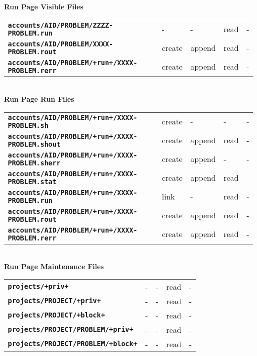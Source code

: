 \documentclass[12pt]{article}
\newcommand{\TT}[1]{{\tt \bfseries #1}}
\begin{document}
\begin{center}
{\bf Run Page Visible Files}
\\[1ex]
\begin{tabular}{lllll}
\TT{accounts/AID/PROBLEM/ZZZZ-PROBLEM.run}  & -  & - & read & - \\
\TT{accounts/AID/PROBLEM/XXXX-PROBLEM.rout} & create  & append  & read & - \\
\TT{accounts/AID/PROBLEM/+run+/XXXX-PROBLEM.rerr}
					    & create  & append  & read & - \\
\end{tabular}
\\\bigskip
{\bf Run Page Run Files}
\\[1ex]
\begin{tabular}{lllll}
\TT{accounts/AID/PROBLEM/+run+/XXXX-PROBLEM.sh}     & create  & - & - & - \\
\TT{accounts/AID/PROBLEM/+run+/XXXX-PROBLEM.shout}  & create  & append & read
                                                                       & - \\
\TT{accounts/AID/PROBLEM/+run+/XXXX-PROBLEM.sherr}  & create  & append & -
                                                                       & - \\
\TT{accounts/AID/PROBLEM/+run+/XXXX-PROBLEM.stat}   & create  & append & read
                                                                       & - \\
\TT{accounts/AID/PROBLEM/+run+/XXXX-PROBLEM.run}    & link    & - & read & - \\
\TT{accounts/AID/PROBLEM/+run+/XXXX-PROBLEM.rout}   & create  & append & read
                                                                       & - \\
\TT{accounts/AID/PROBLEM/+run+/XXXX-PROBLEM.rerr}   & create  & append & read
                                                                       & - \\
\end{tabular}
\\\bigskip
{\bf Run Page Maintenance Files}
\\[1ex]
\begin{tabular}{lllll}
\TT{projects/+priv+}			& -  & - & read & - \\
\TT{projects/PROJECT/+priv+}		& -  & - & read & - \\
\TT{projects/PROJECT/+block+}		& -  & - & read & - \\
\TT{projects/PROJECT/PROBLEM/+priv+}	& -  & - & read & - \\
\TT{projects/PROJECT/PROBLEM/+block+}	& -  & - & read & - \\
\end{tabular}
\end{center}
\end{document}
